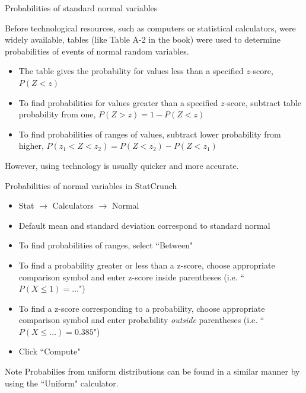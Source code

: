 \documentclass[xcolor=table, handout]{beamer}
\begin{document}
\begin{frame}{Probabilities of standard normal variables}
\begin{block}{}
Before technological resources, such as computers or statistical calculators, were widely available, tables (like Table A-2 in the book) were used to determine probabilities of events of normal random variables.
\begin{itemize}
\pause\item The table gives the probability for values less than a specified $z$-score, $P(Z < z)$
\pause\item To find probabilities for values greater than a specified $z$-score, subtract table probability from one, $P(Z > z) = 1-P(Z<z)$
\pause\item To find probabilities of ranges of values, subtract lower probability from higher, $P(z_1 < Z < z_2) = P(Z < z_2) - P(Z < z_1)$
\end{itemize}
\medskip
\pause However, using technology is usually quicker and more accurate.
\end{block}
\end{frame}

\begin{frame}{Probabilities of normal variables in StatCrunch}
\begin{block}{}
\begin{itemize}
\item Stat $\to$ Calculators $\to$ Normal
\item Default mean and standard deviation correspond to standard normal
\item To find probabilities of ranges, select ``Between"
\item To find a probability greater or less than a z-score, choose appropriate comparison symbol and enter z-score inside parentheses (i.e. ``$P(X \le 1) =\ldots$")
\item To find a z-score corresponding to a probability, choose appropriate comparison symbol and enter probability \emph{outside} parentheses (i.e. ``$P(X \le \ldots) = 0.385$")
\item Click ``Compute"
\end{itemize}
\end{block}

\begin{alertblock}{Note}
Probabilies from uniform distributions can be found in a similar manner by using the ``Uniform" calculator.
\end{alertblock}
\end{frame}
\end{document}
